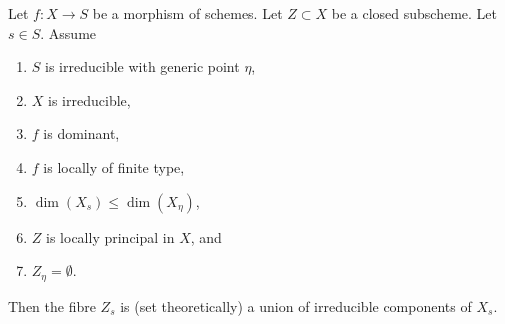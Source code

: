 \begin{lemma}
\label{lemma-locally-principal-vertical}
Let $f : X \to S$ be a morphism of schemes.
Let $Z \subset X$ be a closed subscheme.
Let $s \in S$.
Assume
\begin{enumerate}
\item $S$ is irreducible with generic point $\eta$,
\item $X$ is irreducible,
\item $f$ is dominant,
\item $f$ is locally of finite type,
\item $\dim(X_s) \leq \dim(X_\eta)$,
\item $Z$ is locally principal in $X$, and
\item $Z_\eta = \emptyset$.
\end{enumerate}
Then the fibre $Z_s$ is (set theoretically) a union of
irreducible components of $X_s$.
\end{lemma}

